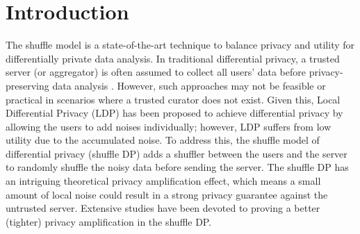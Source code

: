 \documentclass[letterpaper]{article} %
\begin{document}
\section{Introduction}
The shuffle model \cite{Bittau2017prochlo} is a state-of-the-art technique to balance privacy and utility for differentially private data analysis.
In traditional differential privacy, a trusted server (or aggregator) is often assumed to collect all users' data before privacy-preserving data analysis \cite{Dwork2014algorithmic}. 
However, such approaches may not be feasible or practical in scenarios where a trusted curator does not exist.  
Given this, Local Differential Privacy (LDP) \cite{KS11} has been proposed to achieve differential privacy by allowing the users to add noises individually; however, LDP suffers from low utility due to the accumulated noise. %
To address this, the shuffle model of differential privacy (shuffle DP) \cite{Bittau2017prochlo, balle2019privacy, Erlingsson2019amplification} adds a shuffler between the users and the server to randomly shuffle the noisy data before sending the server.
The shuffle DP has an intriguing theoretical privacy amplification effect, which means a small amount of local noise could result in a strong privacy guarantee against the untrusted server.
Extensive studies \cite{balle2019privacy,Erlingsson2019amplification,Girgis2021renyi,Feldman2022hiding, liu2021flame,GDDSK21federated} have been devoted to proving a better (tighter) privacy amplification in the shuffle DP.
\end{document}

